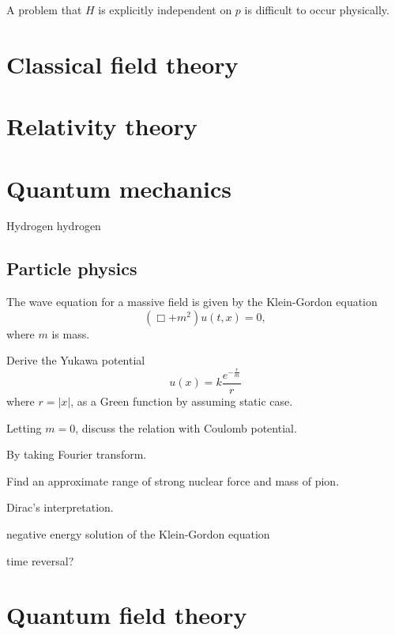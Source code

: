 \documentclass{../prb}
\begin{document}
A problem that $H$ is explicitly independent on $p$ is difficult to occur physically.

\chapter{Classical field theory}



\chapter{Relativity theory}



\chapter{Quantum mechanics}
\begin{prb}
Hydrogen
\q hydrogen
\end{prb}


\section{Particle physics}
\begin{prb}
The wave equation for a massive field is given by the Klein-Gordon equation
\[(\Box+m^2)u(t,x)=0,\]
where $m$ is mass.
\begin{cond}
\item Derive the Yukawa potential\[u(x)=k\frac{e^{-\frac rm}}r\]where $r=|x|$, as a Green function by assuming static case.
\item Letting $m=0$, discuss the relation with Coulomb potential.
\item By taking Fourier transform.
\item Find an approximate range of strong nuclear force and mass of pion.
\end{cond}
\end{prb}

\begin{prb}
Dirac's interpretation.
\item negative energy solution of the Klein-Gordon equation
\item time reversal?
\end{prb}

\begin{prb}
\end{prb}

\begin{prb}
\end{prb}

\chapter{Quantum field theory}
\end{document}
